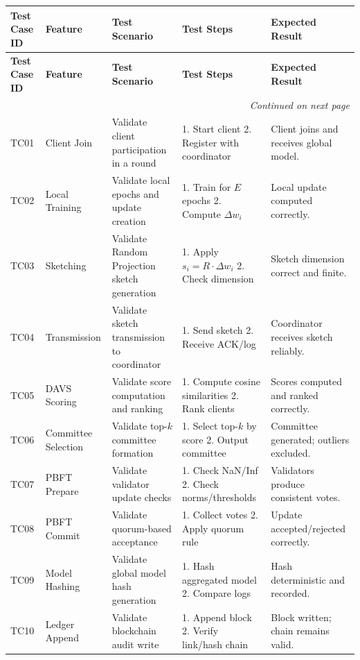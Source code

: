 \begin{longtable}{|p{1.1cm}|p{2cm}|p{2.5cm}|p{3cm}|p{3cm}|}
\hline
\textbf{Test Case ID} & \textbf{Feature} & \textbf{Test Scenario} & \textbf{Test Steps} & \textbf{Expected Result} \\
\hline
\endfirsthead

\hline
\textbf{Test Case ID} & \textbf{Feature} & \textbf{Test Scenario} & \textbf{Test Steps} & \textbf{Expected Result} \\
\hline
\endhead

\hline \multicolumn{5}{r}{\emph{Continued on next page}} \\
\endfoot

\hline
\endlastfoot

TC01 & Client Join & Validate client participation in a round & 1. Start client 2. Register with coordinator & Client joins and receives global model. \\
\hline
TC02 & Local Training & Validate local epochs and update creation & 1. Train for \(E\) epochs 2. Compute \(\Delta w_i\) & Local update computed correctly. \\
\hline
TC03 & Sketching & Validate Random Projection sketch generation & 1. Apply \(s_i = R \cdot \Delta w_i\) 2. Check dimension & Sketch dimension correct and finite. \\
\hline
TC04 & Transmission & Validate sketch transmission to coordinator & 1. Send sketch 2. Receive ACK/log & Coordinator receives sketch reliably. \\
\hline
TC05 & DAVS Scoring & Validate score computation and ranking & 1. Compute cosine similarities 2. Rank clients & Scores computed and ranked correctly. \\
\hline
TC06 & Committee Selection & Validate top-\(k\) committee formation & 1. Select top-\(k\) by score 2. Output committee & Committee generated; outliers excluded. \\
\hline
TC07 & PBFT Prepare & Validate validator update checks & 1. Check NaN/Inf 2. Check norms/thresholds & Validators produce consistent votes. \\
\hline
TC08 & PBFT Commit & Validate quorum-based acceptance & 1. Collect votes 2. Apply quorum rule & Update accepted/rejected correctly. \\
\hline
TC09 & Model Hashing & Validate global model hash generation & 1. Hash aggregated model 2. Compare logs & Hash deterministic and recorded. \\
\hline
TC10 & Ledger Append & Validate blockchain audit write & 1. Append block 2. Verify link/hash chain & Block written; chain remains valid. \\

\end{longtable}
